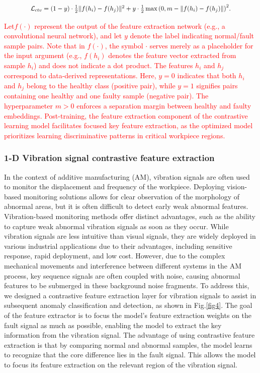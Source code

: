 \documentclass[preprint,12pt]{elsarticle}
\begin{document}
  \begin{equation}
    \scalebox{0.9}{$
      \mathcal{L}_{ctv} = (1-y) \cdot \frac{1}{2} \| f(h_i) - f(h_j) \|^2 + y \cdot \frac{1}{2} \max \left( 0, m - \| f(h_i) - f(h_j) \| \right)^2
    $.}
    \label{eq1}
  \end{equation}

  \textcolor{red}{Let$f(\cdot)$ represent the output of the feature extraction network (e.g., a convolutional neural network), and let $y$ denote the label indicating normal/fault sample pairs. Note that in $f(\cdot)$, the symbol $\cdot$ serves merely as a placeholder for the input argument (e.g., $f(h_i)$ denotes the feature vector extracted from sample $h_i$) and does not indicate a dot product. The features $h_i$ and $h_j$ correspond to data-derived representations. Here, $y=0$ indicates that both $h_i$ and $h_j$ belong to the healthy class (positive pair), while $y=1$ signifies pairs containing one healthy and one faulty sample (negative pair). The hyperparameter $m>0$ enforces a separation margin between healthy and faulty embeddings. Post-training, the feature extraction component of the contrastive learning model facilitates focused key feature extraction, as the optimized model prioritizes learning discriminative patterns in critical workpiece regions.}

  \subsubsection{1-D Vibration signal contrastive feature extraction}

  In the context of additive manufacturing (AM), vibration signals are often used to monitor the displacement and frequency of the workpiece. Deploying vision-based monitoring solutions allows for clear observation of the morphology of abnormal areas, but it is often difficult to detect early weak abnormal features. Vibration-based monitoring methods offer distinct advantages, such as the ability to capture weak abnormal vibration signals as soon as they occur. While vibration signals are less intuitive than visual signals, they are widely deployed in various industrial applications due to their advantages, including sensitive response, rapid deployment, and low cost. However, due to the complex mechanical movements and interference between different systems in the AM process, key sequence signals are often coupled with noise, causing abnormal features to be submerged in these background noise fragments. To address this, we designed a contrastive feature extraction layer for vibration signals to assist in subsequent anomaly classification and detection, as shown in Fig.\ref{fig4}. The goal of the feature extractor is to focus the model's feature extraction weights on the fault signal as much as possible, enabling the model to extract the key information from the vibration signal. The advantage of using contrastive feature extraction is that by comparing normal and abnormal samples, the model learns to recognize that the core difference lies in the fault signal. This allows the model to focus its feature extraction on the relevant region of the vibration signal.
\end{document}
